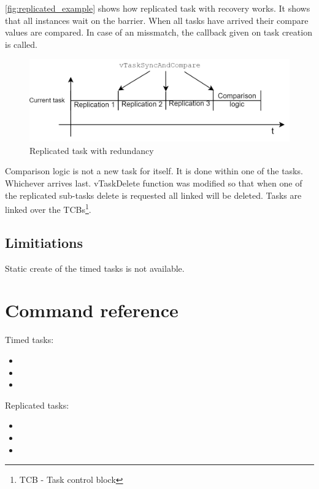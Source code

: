 \autoref{fig:replicated_example} shows how replicated task with recovery works. It shows that all instances wait on the barrier. When all tasks have arrived their compare values are compared. In case of an missmatch, the callback given on task creation is called. 


\begin{figure}[H]

      \centering
      \includegraphics[width=\linewidth]{images/replicated_example.png}
      \caption{Replicated task with redundancy}
      \label{fig:replicated_example}
    
\end{figure}

Comparison logic is not a new task for itself. It is done within one of the tasks. Whichever arrives last. vTaskDelete function was modified so that when one of the replicated sub-tasks delete is requested all linked will be deleted. Tasks are linked over the TCBs\footnote{TCB - Task control block}.

\subsection{Limitiations}

Static create of the timed tasks is not available.

\section{Command reference}

Timed tasks:
\begin{itemize}

    \item {}
    \item {}
    \item {}
    
\end{itemize}

\noindent Replicated tasks:
\begin{itemize}

    \item {}
    \item {}
    \item {}
    
\end{itemize}

